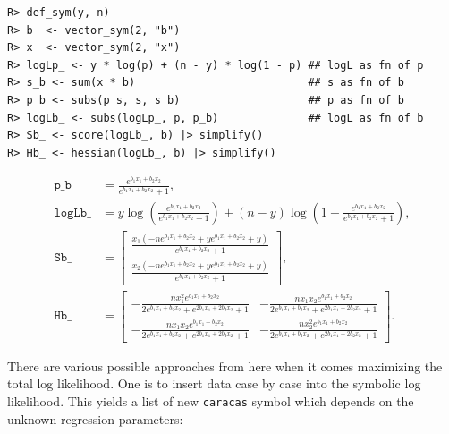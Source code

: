 \begin{verbatim}
R> def_sym(y, n)
R> b  <- vector_sym(2, "b")
R> x  <- vector_sym(2, "x")
R> logLp_ <- y * log(p) + (n - y) * log(1 - p) ## logL as fn of p
R> s_b <- sum(x * b)                           ## s as fn of b
R> p_b <- subs(p_s, s, s_b)                    ## p as fn of b
R> logLb_ <- subs(logLp_, p, p_b)              ## logL as fn of b
R> Sb_ <- score(logLb_, b) |> simplify()
R> Hb_ <- hessian(logLb_, b) |> simplify()
\end{verbatim}

\begin{align}
\texttt{p\_b}   &= \frac{e^{b_{1} x_{1} + b_{2} x_{2}}}{e^{b_{1} x_{1} + b_{2} x_{2}} + 1}, \\
\texttt{logLb}\_ &= y \log{\left(\frac{e^{b_{1} x_{1} + b_{2} x_{2}}}{e^{b_{1} x_{1} + b_{2} x_{2}} + 1} \right)} + \left(n - y\right) \log{\left(1 - \frac{e^{b_{1} x_{1} + b_{2} x_{2}}}{e^{b_{1} x_{1} + b_{2} x_{2}} + 1} \right)}, \\
\texttt{Sb}\_    &= \left[\begin{matrix}\frac{x_{1} \left(- n e^{b_{1} x_{1} + b_{2} x_{2}} + y e^{b_{1} x_{1} + b_{2} x_{2}} + y\right)}{e^{b_{1} x_{1} + b_{2} x_{2}} + 1}\\\frac{x_{2} \left(- n e^{b_{1} x_{1} + b_{2} x_{2}} + y e^{b_{1} x_{1} + b_{2} x_{2}} + y\right)}{e^{b_{1} x_{1} + b_{2} x_{2}} + 1}\end{matrix}\right], \\
\texttt{Hb}\_    &= \left[\begin{matrix}- \frac{n x_{1}^{2} e^{b_{1} x_{1} + b_{2} x_{2}}}{2 e^{b_{1} x_{1} + b_{2} x_{2}} + e^{2 b_{1} x_{1} + 2 b_{2} x_{2}} + 1} & - \frac{n x_{1} x_{2} e^{b_{1} x_{1} + b_{2} x_{2}}}{2 e^{b_{1} x_{1} + b_{2} x_{2}} + e^{2 b_{1} x_{1} + 2 b_{2} x_{2}} + 1}\\- \frac{n x_{1} x_{2} e^{b_{1} x_{1} + b_{2} x_{2}}}{2 e^{b_{1} x_{1} + b_{2} x_{2}} + e^{2 b_{1} x_{1} + 2 b_{2} x_{2}} + 1} & - \frac{n x_{2}^{2} e^{b_{1} x_{1} + b_{2} x_{2}}}{2 e^{b_{1} x_{1} + b_{2} x_{2}} + e^{2 b_{1} x_{1} + 2 b_{2} x_{2}} + 1}\end{matrix}\right] . 
\end{align}

There are various possible approaches from here when it comes
maximizing the total log likelihood. One is to insert data case by
case into the symbolic log likelihood. This yields a list of new \texttt{caracas}
symbol which depends on the unknown regression parameters:

